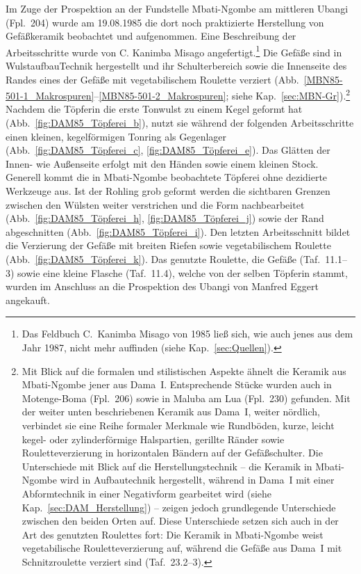 Im Zuge der Prospektion an der Fundstelle Mbati-Ngombe am mittleren Ubangi (Fpl.~204) wurde am 19.08.1985 die dort noch praktizierte Herstellung von Gefäßkeramik beobachtet und aufgenommen. Eine Beschreibung der Arbeitsschritte wurde von C. Kanimba Misago angefertigt.\footnote{Das Feldbuch C.~Kanimba Misago von 1985 ließ sich, wie auch jenes aus dem Jahr 1987, nicht mehr auffinden (siehe Kap.~\ref{sec:Quellen}).\label{ftn:Kanimba_Feldbuch85_fehlt}} Die Gefäße sind in WulstaufbauTechnik hergestellt und ihr Schulterbereich sowie die Innenseite des Randes eines der Gefäße mit vegetabilischem Roulette verziert (Abb.~\ref{MBN85-501-1_Makrospuren}--\ref{MBN85-501-2_Makrospuren}; siehe Kap.~\ref{sec:MBN-Gr}).\footnote{Mit Blick auf die formalen und stilistischen Aspekte ähnelt die Keramik aus Mbati-Ngombe jener aus Dama~I. Entsprechende Stücke wurden auch in Motenge-Boma (Fpl.~206) sowie in Maluba am Lua (Fpl.~230) gefunden. Mit der weiter unten beschriebenen Keramik aus Dama~I, weiter nördlich, verbindet sie eine Reihe formaler Merkmale wie Rundböden, kurze, leicht kegel- oder zylinderförmige Halspartien, gerillte Ränder sowie Rouletteverzierung in horizontalen Bändern auf der Gefäßschulter. Die Unterschiede mit Blick auf die Herstellungstechnik -- die Keramik in Mbati-Ngombe wird in Aufbautechnik hergestellt, während in Dama~I mit einer Abformtechnik in einer Negativform gearbeitet wird (siehe Kap.~\ref{sec:DAM_Herstellung}) -- zeigen jedoch grundlegende Unterschiede zwischen den beiden Orten auf. Diese Unterschiede setzen sich auch in der Art des genutzten Roulettes fort: Die Keramik in Mbati-Ngombe weist vegetabilische Rouletteverzierung auf, während die Gefäße aus Dama~I mit Schnitzroulette verziert sind (Taf.~23.2--3).} Nachdem die Töpferin die erste Tonwulst zu einem Kegel geformt hat (Abb.~\ref{fig:DAM85_Töpferei_b}), nutzt sie während der folgenden Arbeitsschritte einen kleinen, kegelförmigen Tonring als Gegenlager (Abb.~\ref{fig:DAM85_Töpferei_c}, \ref{fig:DAM85_Töpferei_e}). Das Glätten der Innen- wie Außenseite erfolgt mit den Händen sowie einem kleinen Stock. Generell kommt die in Mbati-Ngombe beobachtete Töpferei ohne dezidierte Werkzeuge aus. Ist der Rohling grob geformt werden die sichtbaren Grenzen zwischen den Wülsten weiter verstrichen und die Form nachbearbeitet (Abb.~\ref{fig:DAM85_Töpferei_h}, \ref{fig:DAM85_Töpferei_j}) sowie der Rand abgeschnitten (Abb.~\ref{fig:DAM85_Töpferei_i}). Den letzten Arbeitsschnitt bildet die Verzierung der Gefäße mit breiten Riefen sowie vegetabilischem Roulette (Abb.~\ref{fig:DAM85_Töpferei_k}). Das genutzte Roulette, die Gefäße (Taf.~11.1--3) sowie eine kleine Flasche (Taf.~11.4), welche von der selben Töpferin stammt, wurden im Anschluss an die Prospektion des Ubangi von Manfred Eggert angekauft.

